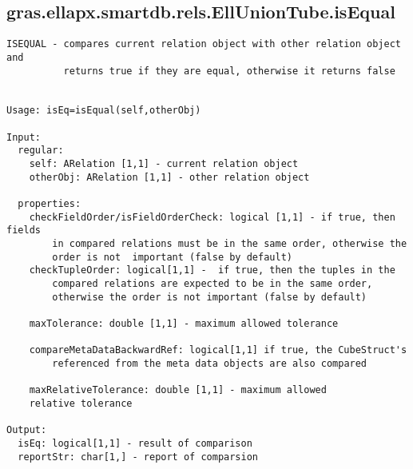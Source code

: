 \subsection{\texorpdfstring{gras.ellapx.smartdb.rels.EllUnionTube.isEqual}{isEqual}}\label{method:gras.ellapx.smartdb.rels.EllUnionTube.isEqual}
\begin{verbatim}
ISEQUAL - compares current relation object with other relation object and
          returns true if they are equal, otherwise it returns false


Usage: isEq=isEqual(self,otherObj)

Input:
  regular:
    self: ARelation [1,1] - current relation object
    otherObj: ARelation [1,1] - other relation object

  properties:
    checkFieldOrder/isFieldOrderCheck: logical [1,1] - if true, then fields
        in compared relations must be in the same order, otherwise the
        order is not  important (false by default)
    checkTupleOrder: logical[1,1] -  if true, then the tuples in the
        compared relations are expected to be in the same order,
        otherwise the order is not important (false by default)

    maxTolerance: double [1,1] - maximum allowed tolerance

    compareMetaDataBackwardRef: logical[1,1] if true, the CubeStruct's
        referenced from the meta data objects are also compared

    maxRelativeTolerance: double [1,1] - maximum allowed
    relative tolerance

Output:
  isEq: logical[1,1] - result of comparison
  reportStr: char[1,] - report of comparsion
\end{verbatim}
